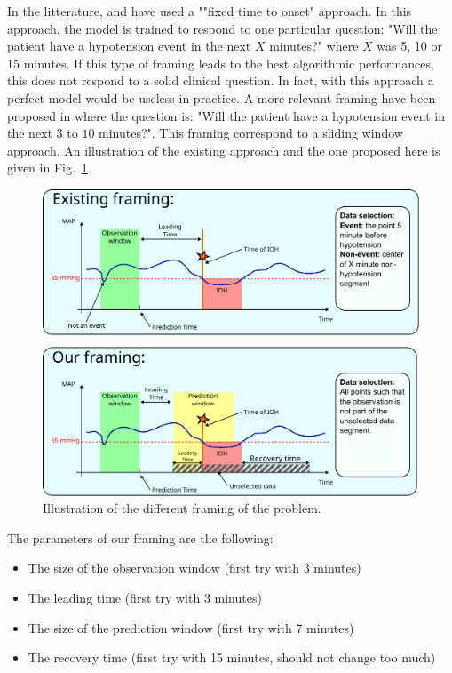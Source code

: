 \documentclass[a4paper,12pt]{article}
\begin{document}
In the litterature, \cite{hatibMachinelearningAlgorithmPredict2018} and \cite{leeDeepLearningModels2021} have used a ""fixed time to onset" approach. In this approach, the model is trained to respond to one particular question: "Will the patient have a hypotension event in the next $X$ minutes?" where $X$ was 5, 10 or 15 minutes. If this type of framing leads to the best algorithmic performances, this does not respond to a solid clinical question. In fact, with this approach a perfect model would be useless in practice. A more relevant framing have been proposed in \cite{enevoldsenSelectionBiasHypotension2023} where the question is: "Will the patient have a hypotension event in the next $3$ to $10$ minutes?". This framing correspond to a sliding window approach. An illustration of the existing approach and the one proposed here is given in Fig.~\ref{fig:framing}.

\begin{figure}
    \centering
    \includegraphics[width=\textwidth]{figures/framing.pdf}
    \caption{Illustration of the different framing of the problem.}
    \label{fig:framing}
\end{figure}

The parameters of our framing are the following:
\begin{itemize}
    \item The size of the observation window (first try with 3 minutes)
    \item The leading time (first try with 3 minutes)
    \item The size of the prediction window (first try with 7 minutes)
    \item The recovery time (first try with 15 minutes, should not change too much)
\end{itemize}
\end{document}
